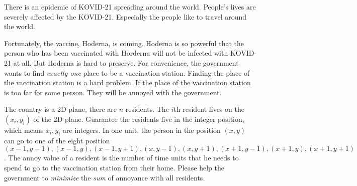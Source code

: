 There is an epidemic of KOVID-21 spreading around the world.
People's lives are severely affected by the KOVID-21. 
Especially the people like to travel around the world.

Fortunately, the vaccine, Hoderna, is coming.
Hoderna is so powerful that the person who has been vaccinated with Horderna will not be infected with KOVID-21 at all.
But Hoderna is hard to preserve. 
For convenience, the government wants to find \emph{exactly one} place to be a vaccination station.
Finding the place of the vaccination station is a hard problem.
If the place of the vaccination station is too far for some person. 
They will be annoyed with the government.

The country is a 2D plane, there are $n$ residents.
The $i$th resident lives on the $(x_i,y_i)$ of the 2D plane.
Guarantee the residents live in the integer position, which means $x_i,y_i$ are integers.
In one unit, the person in the position $(x,y)$ can go to one of the eight position
$(x-1,y-1),(x-1,y),(x-1,y+1),(x,y-1),(x,y+1),(x+1,y-1),(x+1,y),(x+1,y+1)$.
The annoy value of a resident is the number of time units that he needs to spend to go to the vaccination station from their home.
Please help the government to \emph{minimize} the \emph{sum} of annoyance with all residents.

